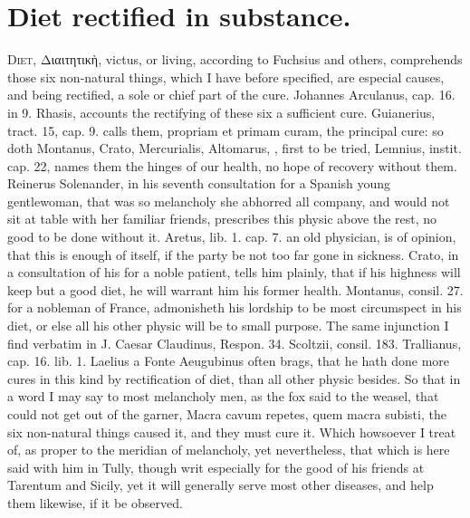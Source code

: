 {%
\section{Diet rectified in substance.}

\lettrine{D}{iet}, \textgreek[variant=ancient]{Διαιτητικὴ}, victus, or living, according to  Fuchsius and
others, comprehends those six non-natural things, which I have before
specified, are especial causes, and being rectified, a sole or chief
part of the cure. Johannes Arculanus, cap. 16. in 9. Rhasis,
accounts the rectifying of these six a sufficient cure. Guianerius,
tract. 15, cap. 9. calls them, propriam et primam curam, the principal
cure: so doth Montanus, Crato, Mercurialis, Altomarus, \etc{}, first to be
tried, Lemnius, instit. cap. 22, names them the hinges of our health,
no hope of recovery without them. Reinerus Solenander, in his
seventh consultation for a Spanish young gentlewoman, that was so
melancholy she abhorred all company, and would not sit at table with
her familiar friends, prescribes this physic above the rest, no
good to be done without it. Aretus, lib. 1. cap. 7. an old
physician, is of opinion, that this is enough of itself, if the party
be not too far gone in sickness. Crato, in a consultation of his
for a noble patient, tells him plainly, that if his highness will keep
but a good diet, he will warrant him his former health. Montanus,
consil. 27. for a nobleman of France, admonisheth his lordship to be
most circumspect in his diet, or else all his other physic will
be to small purpose. The same injunction I find verbatim in J.
Caesar Claudinus, Respon. 34. Scoltzii, consil. 183. Trallianus, cap.
16. lib. 1. Laelius a Fonte Aeugubinus often brags, that he hath done
more cures in this kind by rectification of diet, than all other physic
besides. So that in a word I may say to most melancholy men, as the fox
said to the weasel, that could not get out of the garner, Macra cavum
repetes, quem macra subisti, the six non-natural things caused
it, and they must cure it. Which howsoever I treat of, as proper to the
meridian of melancholy, yet nevertheless, that which is here said with
him in Tully, though writ especially for the good of his friends
at Tarentum and Sicily, yet it will generally serve most other
diseases, and help them likewise, if it be observed.

}
